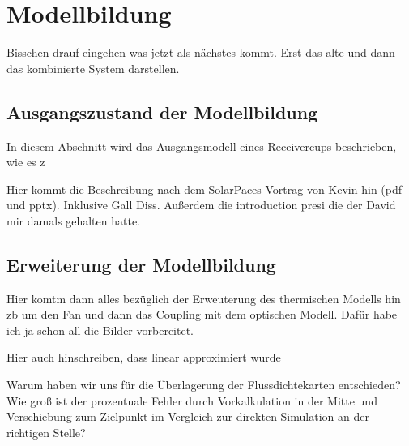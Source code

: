 \chapter{Modellbildung} \label{ch_Modellbildung}
Bisschen drauf eingehen was jetzt als nächstes kommt.
Erst das alte und dann das kombinierte System darstellen.

\section{Ausgangszustand der Modellbildung} \label{sec_Ausgangszustand}
In diesem Abschnitt wird das Ausgangsmodell eines Receivercups beschrieben, wie es z

Hier kommt die Beschreibung nach dem SolarPaces Vortrag von Kevin hin (pdf und pptx).
Inklusive Gall Diss. Außerdem die introduction presi die der David mir damals gehalten hatte.

\section{Erweiterung der Modellbildung} \label{sec_ErweiterungModellbildung}
Hier komtm dann alles bezüglich der Erweuterung des thermischen Modells hin zb um den Fan und dann das Coupling mit dem optischen Modell.
Dafür habe ich ja schon all die Bilder vorbereitet.


Hier auch hinschreiben, dass linear approximiert wurde

Warum haben wir uns für die Überlagerung der Flussdichtekarten entschieden?
Wie groß ist der prozentuale Fehler durch Vorkalkulation in der Mitte und Verschiebung zum Zielpunkt im Vergleich zur direkten Simulation an der richtigen Stelle?